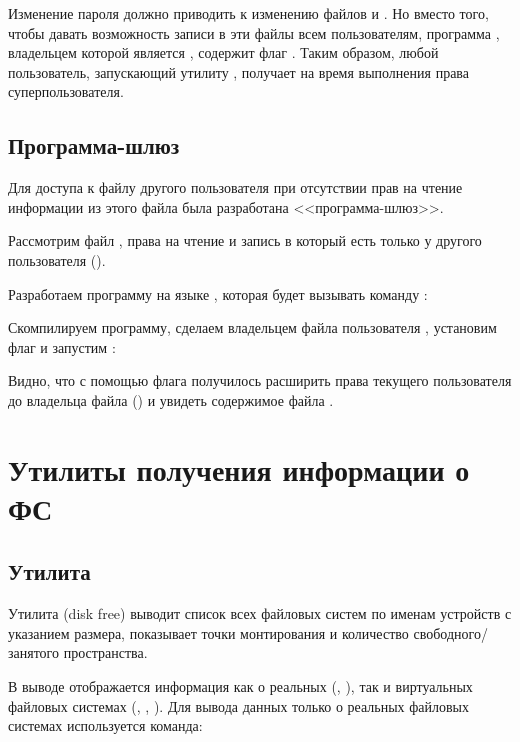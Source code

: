 Изменение пароля должно приводить к изменению файлов  и . Но вместо того, чтобы давать возможность записи в эти файлы всем пользователям, программа , владельцем которой является , содержит флаг . Таким образом, любой пользователь, запускающий утилиту , получает на время выполнения права суперпользователя.

\subsection{Программа-шлюз}

Для доступа к файлу другого пользователя при отсутствии прав на чтение информации из этого файла была разработана <<программа-шлюз>>. 

Рассмотрим файл , права на чтение и запись в который есть только у другого пользователя ().


Разработаем программу на языке , которая будет вызывать команду :


Скомпилируем программу, сделаем владельцем файла пользователя , установим флаг  и запустим :


Видно, что с помощью флага  получилось расширить права текущего пользователя до владельца файла () и увидеть содержимое файла .

\section{Утилиты получения информации о ФС}

\subsection{Утилита }

Утилита  (disk free) выводит список всех файловых систем по именам устройств с указанием размера, показывает точки монтирования и количество свободного/занятого пространства.


В выводе отображается информация как о реальных (, ), так и виртуальных файловых системах (, , ). Для вывода данных только о реальных файловых системах используется команда:


